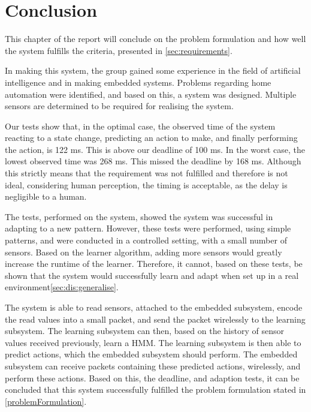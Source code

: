 \chapter{Conclusion}

This chapter of the report will conclude on the problem formulation and how well the system fulfills the criteria, presented in \cref{sec:requirements}.

In making this system, the group gained some experience in the field of artificial intelligence and in making embedded systems. Problems regarding home automation were identified, and based on this, a system was designed. Multiple sensors are determined to be required for realising the system. 

Our tests show that, in the optimal case, the observed time of the system reacting to a state change, predicting an action to make, and finally performing the action, is 122 ms. This is above our deadline of 100 ms. In the worst case, the lowest observed time was 268 ms. This missed the deadline by 168 ms. Although this strictly means that the requirement was not fulfilled and therefore is not ideal, considering human perception, the timing is acceptable, as the delay is negligible to a human.

The tests, performed on the system, showed the system was successful in adapting to a new pattern. However, these tests were performed, using simple patterns, and were conducted in a controlled setting, with a small number of sensors. Based on the learner algorithm, adding more sensors would greatly increase the runtime of the learner. Therefore, it cannot, based on these tests, be shown that the system would successfully learn and adapt when set up in a real environment\cref{sec:dis:generalise}.

The system is able to read sensors, attached to the embedded subsystem, encode the read values into a small packet, and send the packet wirelessly to the learning subsystem. The learning subsystem can then, based on the history of sensor values received previously, learn a HMM. The learning subsystem is then able to predict actions, which the embedded subsystem should perform. The embedded subsystem can receive packets containing these predicted actions, wirelessly, and perform these actions. Based on this, the deadline, and adaption tests, it can be concluded that this system successfully fulfilled the problem formulation stated in \cref{problemFormulation}.  
